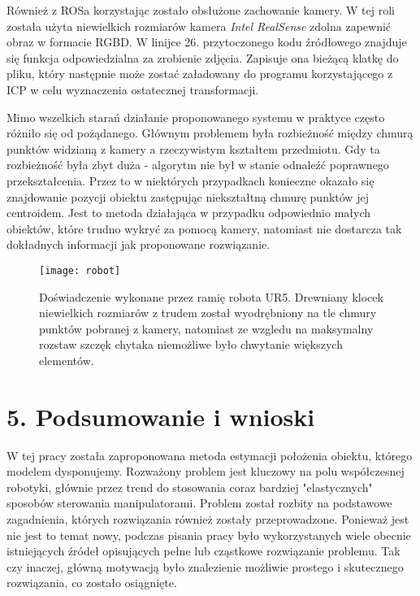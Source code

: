 \documentclass{article}
\begin{document}
\newpage
 
\vspace{5mm}

Również z ROSa korzystając zostało obsłużone zachowanie kamery. W tej roli została użyta niewielkich rozmiarów kamera \emph{Intel RealSense} zdolna zapewnić obraz w formacie RGBD. W linijce 26. przytoczonego kodu źródłowego znajduje się funkcja odpowiedzialna za zrobienie zdjęcia. Zapisuje ona bieżącą klatkę do pliku, który następnie może zostać załadowany do programu korzystającego z ICP w celu wyznaczenia ostatecznej transformacji.

\vspace{5mm}

\vspace{5mm}

Mimo wszelkich starań działanie proponowanego systemu w praktyce często różniło się od pożądanego. Głównym problemem była rozbieżność między chmurą punktów widzianą z kamery a rzeczywistym kształtem przedmiotu. Gdy ta rozbieżność była zbyt duża - algorytm nie był w stanie odnaleźć poprawnego przekształcenia. Przez to w niektórych przypadkach konieczne okazało się znajdowanie pozycji obiektu zastępując niekształtną chmurę punktów jej centroidem. Jest to metoda działająca w przypadku odpowiednio małych obiektów, które trudno wykryć za pomocą kamery, natomiast nie dostarcza tak dokładnych informacji jak proponowane rozwiązanie.

\begin{figure}[h]
\centering
\texttt{[image: robot]}
\caption{Doświadczenie wykonane przez ramię robota UR5. Drewniany klocek niewielkich rozmiarów z trudem został wyodrębniony na tle chmury punktów pobranej z kamery, natomiast ze wzgledu na maksymalny rozstaw szczęk chytaka niemożliwe było chwytanie większych elementów.}
\end{figure}

\newpage
\section*{\LARGE{5. Podsumowanie i wnioski}} 

W tej pracy została zaproponowana metoda estymacji położenia obiektu, którego modelem dysponujemy. Rozważony problem jest kluczowy na polu współczesnej robotyki, głównie przez trend do stosowania coraz bardziej "elastycznych" sposobów sterowania manipulatorami. Problem został rozbity na podstawowe zagadnienia, których rozwiązania również zostały przeprowadzone. Ponieważ jest nie jest to temat nowy, podczas pisania pracy było wykorzystanych wiele obecnie istniejących źródeł opisujących pełne lub cząstkowe rozwiązanie problemu. Tak czy inaczej, główną motywacją było znalezienie możliwie prostego i skutecznego rozwiązania, co zostało osiągnięte. 
\end{document}
